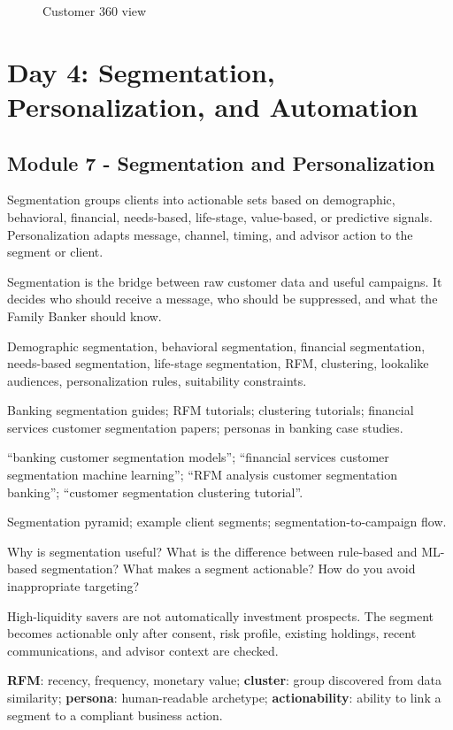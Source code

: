 \documentclass[
	11pt,
	fleqn,
	a4paper,
	oneside,
]{LegrandOrangeBook}
\newcommand{\moduleblock}[9]{%
	\begin{description}[leftmargin=3.4cm, style=nextline, font=\sffamily\bfseries]
		\item[What it is] #1
		\item[Why it matters] #2
		\item[Key concepts] #3
		\item[Resources to find] #4
		\item[Search queries] #5
		\item[Diagrams] #6
		\item[Practical questions] #7
		\item[Mini case] #8
		\item[Key terms] #9
	\end{description}
}
\newcommand{\term}[2]{\textbf{#1}: #2}
\begin{document}
\begin{figure}[H]
	\centering
	\caption{Customer 360 view}
\end{figure}

\chapter{Day 4: Segmentation, Personalization, and Automation}

\section{Module 7 - Segmentation and Personalization}

\moduleblock
{Segmentation groups clients into actionable sets based on demographic, behavioral, financial, needs-based, life-stage, value-based, or predictive signals. Personalization adapts message, channel, timing, and advisor action to the segment or client.}
{Segmentation is the bridge between raw customer data and useful campaigns. It decides who should receive a message, who should be suppressed, and what the Family Banker should know.}
{Demographic segmentation, behavioral segmentation, financial segmentation, needs-based segmentation, life-stage segmentation, RFM, clustering, lookalike audiences, personalization rules, suitability constraints.}
{Banking segmentation guides; RFM tutorials; clustering tutorials; financial services customer segmentation papers; personas in banking case studies.}
{``banking customer segmentation models''; ``financial services customer segmentation machine learning''; ``RFM analysis customer segmentation banking''; ``customer segmentation clustering tutorial''.}
{Segmentation pyramid; example client segments; segmentation-to-campaign flow.}
{Why is segmentation useful? What is the difference between rule-based and ML-based segmentation? What makes a segment actionable? How do you avoid inappropriate targeting?}
{High-liquidity savers are not automatically investment prospects. The segment becomes actionable only after consent, risk profile, existing holdings, recent communications, and advisor context are checked.}
{\term{RFM}{recency, frequency, monetary value}; \term{cluster}{group discovered from data similarity}; \term{persona}{human-readable archetype}; \term{actionability}{ability to link a segment to a compliant business action}.}
\end{document}
